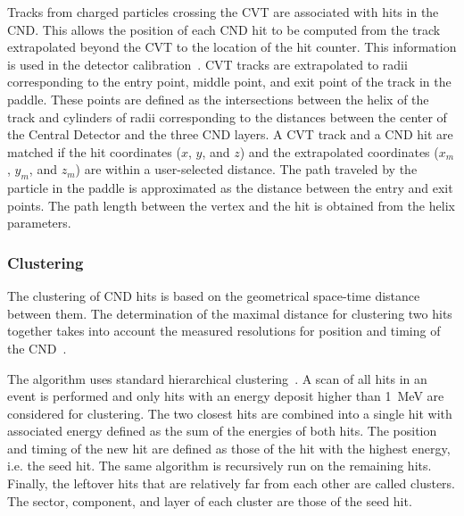Tracks from charged particles crossing the CVT are associated with hits in the CND. This allows the position of each CND hit to be computed from the track extrapolated beyond the CVT to the location of the hit counter.
This information is used in the detector calibration~\cite{cnd-nim}. CVT tracks are extrapolated to radii corresponding to the entry point, middle point, and
exit point of the track in the paddle. These points are defined as the intersections between the helix of the track and cylinders of radii corresponding to the distances between the center of the Central Detector and the three CND layers. A CVT track and a CND hit are matched if the hit coordinates ($x$, $y$, and $z$) and the extrapolated coordinates ($x_m$, $y_m$, and $z_m$) are within a user-selected distance. 
%
%
%
%
The path traveled by the particle in the paddle is approximated as the distance between the entry and exit points. The path length between the vertex and the
hit is obtained from the helix parameters.

\subsubsection{Clustering}

The clustering of CND hits is based on the geometrical space-time distance between them. The determination of
the maximal distance for clustering two hits together takes into account the measured resolutions for position and
timing of the CND~\cite{cnd-nim}.

The algorithm uses standard hierarchical clustering~\cite{Day1984}. A scan of all hits in an event is performed and
only hits with an energy deposit higher than 1~MeV are considered for clustering. The two closest hits are combined
into a single hit with associated energy defined as the sum of the energies of both hits. The position and timing of
the new hit are defined as those of the hit with the highest energy, i.e. the seed hit. The same algorithm is
recursively run on the remaining hits. Finally, the leftover hits that are relatively far from each other are called
clusters. The sector, component, and layer of each cluster are those of the seed hit.
